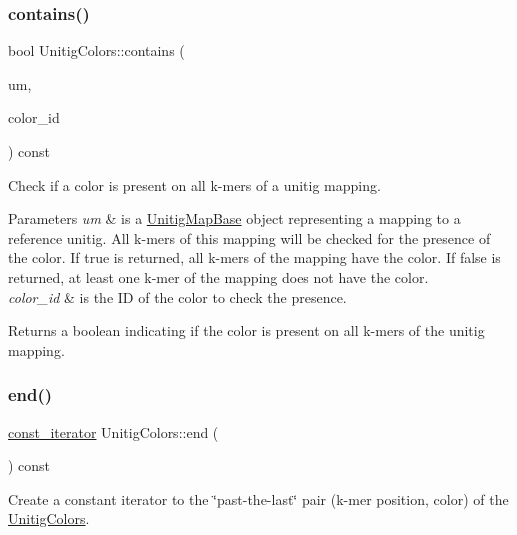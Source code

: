 \subsubsection{\texorpdfstring{contains()}{contains()}}
{\footnotesize\ttfamily bool Unitig\+Colors\+::contains (\begin{DoxyParamCaption}\item[{const \hyperlink{structUnitigMapBase}{Unitig\+Map\+Base} \&}]{um,  }\item[{const size\+\_\+t}]{color\+\_\+id }\end{DoxyParamCaption}) const}



Check if a color is present on all k-\/mers of a unitig mapping. 


\begin{DoxyParams}{Parameters}
{\em um} & is a \hyperlink{structUnitigMapBase}{Unitig\+Map\+Base} object representing a mapping to a reference unitig. All k-\/mers of this mapping will be checked for the presence of the color. If true is returned, all k-\/mers of the mapping have the color. If false is returned, at least one k-\/mer of the mapping does not have the color. \\
\hline
{\em color\+\_\+id} & is the ID of the color to check the presence. \\
\hline
\end{DoxyParams}
\begin{DoxyReturn}{Returns}
a boolean indicating if the color is present on all k-\/mers of the unitig mapping. 
\end{DoxyReturn}
\mbox{\label{classUnitigColors_adf18eea48391e100c5167405a9679b35}} 
\subsubsection{\texorpdfstring{end()}{end()}}
{\footnotesize\ttfamily \hyperlink{classUnitigColors_ad4d35f8af18dfd9cad99e92ca2328fee}{const\+\_\+iterator} Unitig\+Colors\+::end (\begin{DoxyParamCaption}{ }\end{DoxyParamCaption}) const}



Create a constant iterator to the \char`\"{}past-\/the-\/last\char`\"{} pair (k-\/mer position, color) of the \hyperlink{classUnitigColors}{Unitig\+Colors}. 

